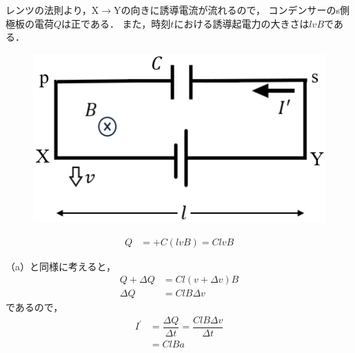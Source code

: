 {
レンツの法則より，X$\rightarrow$Yの向きに誘導電流が流れるので，
コンデンサーのs側極板の電荷$Q$は正である．
また，時刻$t$における誘導起電力の大きさは$lvB$である．\hfill

\begin{figure}
  \vspace{-\intextsep}
  \includegraphics[width=12zw]{../graphs/jumon_134_sol_1.png}
\end{figure}

\begin{align*}
  Q &= +C(lvB) = ClvB
\end{align*}

（a）と同様に考えると，
\begin{align*}
  Q+\Delta Q &= Cl(v+\Delta v)B \\
  \Delta Q &= ClB\Delta v 
\end{align*}
\noindent
であるので，
\begin{align*}
  I^\prime &= \dfrac{\Delta Q}{\Delta t} 
  = \dfrac{ClB\Delta v}{\Delta t} \\
  &= ClBa
\end{align*}

\par}


